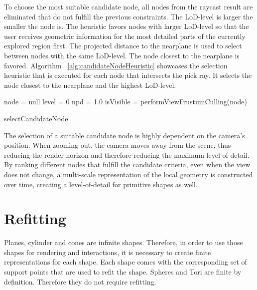 To choose the most suitable candidate node, all nodes from the raycast result are eliminated that do not fulfill the previous constraints. The LoD-level is larger the smaller the node is. The heuristic favors nodes with larger LoD-level so that the user receives geometric information for the most detailed parts of the currently explored region first. The projected distance to the nearplane is used to select between nodes with the same LoD-level. The node closest to the nearplane is favored. Algorithm ~\ref{alg:candidateNodeHeuristic} showcases the selection heuristic that is executed for each node that intersects the pick ray. It selects the node closest to the nearplane and the highest LoD-level.

\begin{algorithm}
	
	node 	= null\;
	level = 0\;
	npd 	= 1.0\;
	{
		isVisible = performViewFrustumCulling(node)\;
	}
\caption{selectCandidateNode}
\label{alg:candidateNodeHeuristic}
\end{algorithm}

The selection of a suitable candidate node is highly dependent on the camera's position. When zooming out, the camera moves away from the scene, thus reducing the render horizon and therefore reducing the maximum level-of-detail. By ranking different nodes that fulfill the candidate criteria, even when the view does not change, a multi-scale representation of the local geometry is constructed over time, creating a level-of-detail for primitive shapes as well. 

\section{Refitting}
\label{sec:Refitting}
Planes, cylinder and cones are infinite shapes. Therefore, in order to use those shapes for rendering and interactions, it is necessary to create finite representations for each shape. Each shape comes with the corresponding set of support points that are used to refit the shape. Spheres and Tori are finite by definition. Therefore they do not require refitting. 

